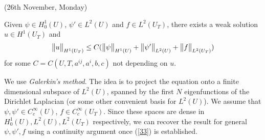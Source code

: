 \documentclass[12pt,a4paper]{report}
\newenvironment{proof}
{\begin{changemargin}{1cm}{0.5cm} 
	}%
	{\end{changemargin}
}
\begin{document}
\newday

(26th November, Monday)
\s

\thm Given $\psi \in H_0^1(U)$, $\psi' \in L^2(U)$ and $f\in L^2(U_T)$, there exists a weak solution $u\in H^1(U_T)$ and
\begin{align}
\bigl\lVert u\bigr\rVert_{H^1(U_T)} \leq C(\bigl\lVert\psi\bigr\rVert_{H^1(U)} +\bigl\lVert\psi'\bigr\rVert_{L^2(U)} + \bigl\lVert f\bigr\rVert_{L^2(U_T)}) \label{33}
\end{align}
for some $C = C(U,T,a^{ij},a^i,b,c)$ not depending on $u$.
\begin{proof}
\pf We use \emph{Galerkin's method}. The idea is to project the equation onto a finite dimensional subspace of $L^2(U)$, spanned by the first $N$ eigenfunctions of the Dirichlet Laplacian (or some other convenient basis for $L^2(U)$). We assume that $\psi, \psi' \in C_c^{\infty}(U)$, $f\in C_c^{\infty}(U_T)$. Since these spaces are dense in $H_0^1(U), L^2(U), L^2(U_T)$ respectively, we can recover the result for general $\psi, \psi',f$ using a continuity argument once (\ref{33}) is established.


\end{proof}
\end{document}
